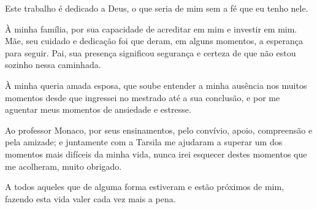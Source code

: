 Este trabalho é dedicado a Deus, o que seria de mim sem a fé que eu tenho nele.

À minha família, por sua capacidade de acreditar em mim e investir em mim. Mãe, seu cuidado e dedicação foi que deram, em alguns momentos, a esperança para seguir. Pai, sua presença significou segurança e certeza de que não estou sozinho nessa caminhada. 

À minha queria amada esposa, que soube entender a minha ausência nos muitos momentos desde que ingressei no mestrado até a sua conclusão, e por me aguentar meus momentos de ansiedade e estresse.

Ao professor Monaco, por seus ensinamentos, pelo convívio, apoio, compreensão e pela amizade; e juntamente com a Tarsila me ajudaram a superar um dos momentos mais difíceis da minha vida, nunca irei esquecer destes momentos que me acolheram, muito obrigado.

A todos aqueles que de alguma forma estiveram e estão próximos de mim, fazendo esta vida valer cada vez mais a pena.
